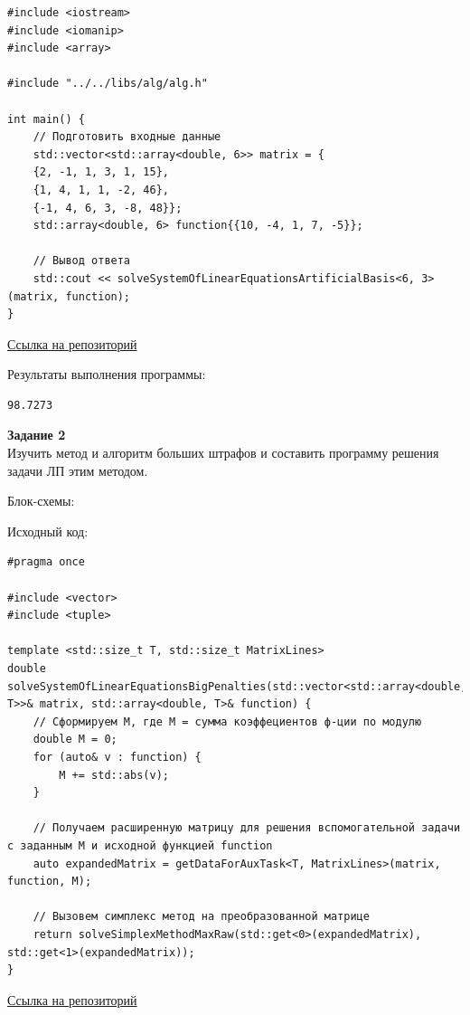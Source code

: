 \documentclass[a4paper,14pt]{extarticle}
\begin{document}
\begin{verbatim}
#include <iostream>
#include <iomanip>
#include <array>

#include "../../libs/alg/alg.h"

int main() {
    // Подготовить входные данные
    std::vector<std::array<double, 6>> matrix = {
    {2, -1, 1, 3, 1, 15},
    {1, 4, 1, 1, -2, 46},
    {-1, 4, 6, 3, -8, 48}};
    std::array<double, 6> function{{10, -4, 1, 7, -5}};

    // Вывод ответа
    std::cout << solveSystemOfLinearEquationsArtificialBasis<6, 3>(matrix, function);
}
    \end{verbatim}
\href{https://github.com/IAmProgrammist/operations_research/blob/master/src/lab3/task1/main.cpp}{Ссылка на репозиторий}\bigbreak

Результаты выполнения программы:
\begin{verbatim}
98.7273
\end{verbatim}

\textbf{Задание 2}\\
Изучить метод и алгоритм больших штрафов и составить
программу решения задачи ЛП этим методом.\bigbreak

Блок-схемы:
\begin{center}
    \bigbreak
    
\end{center}
Исходный код:
\begin{verbatim}
#pragma once 

#include <vector>
#include <tuple>

template <std::size_t T, std::size_t MatrixLines>
double solveSystemOfLinearEquationsBigPenalties(std::vector<std::array<double, T>>& matrix, std::array<double, T>& function) {
    // Сформируем M, где M = сумма коэффециентов ф-ции по модулю
    double M = 0;
    for (auto& v : function) {
        M += std::abs(v);
    }

    // Получаем расширенную матрицу для решения вспомогательной задачи с заданным M и исходной функцией function
    auto expandedMatrix = getDataForAuxTask<T, MatrixLines>(matrix, function, M);

    // Вызовем симплекс метод на преобразованной матрице
    return solveSimplexMethodMaxRaw(std::get<0>(expandedMatrix), std::get<1>(expandedMatrix));
}
    \end{verbatim}
\href{https://github.com/IAmProgrammist/operations_research/blob/master/src/libs/alg/lab3/task2.tpp}{Ссылка на репозиторий}\\
\end{document}
